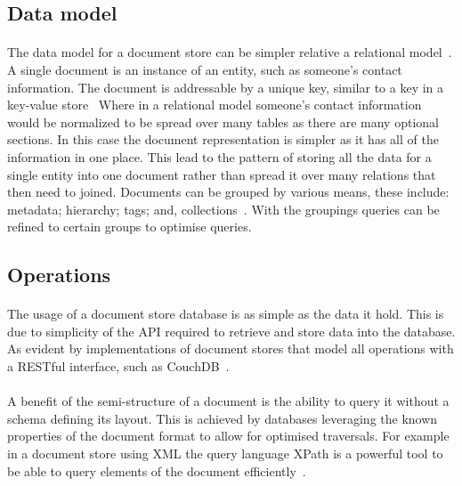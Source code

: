 \documentclass{CRPITStyle}
\renewcommand{\cite}{\citep}
\begin{document}
\subsection{Data model}

\paragraph{}
The data model for a document store can be simpler relative a relational
model~\cite{nosql_survey}.
A single document is an instance of an entity, such as someone's contact information.
The document is addressable by a unique key, similar to a key in a key-value
store~\cite{nosql_survey,sql_nosql}
Where in a relational model someone's contact information would be
normalized to be spread over many tables as there are many optional
sections.
In this case the document representation is simpler as it has all of the
information in one place.
This lead to the pattern of storing all the data for a single entity into
one document rather than spread it over many relations that then need to
joined.
Documents can be grouped by various means,
these include: metadata; hierarchy; tags; and, collections~\cite{sql_nosql}.
With the groupings queries can be refined to certain groups to optimise
queries.

\subsection{Operations}

\paragraph{}
The usage of a document store database is as simple as the data it hold.
This is due to simplicity of the API required to retrieve and store data into
the database.
As evident by implementations of document stores that model all operations
with a RESTful interface, such as CouchDB~\cite{couchdb}.

\paragraph{}
A benefit of the semi-structure of a document is the ability to query it
without a schema defining its layout.
This is achieved by databases leveraging the known properties of the
document format to allow for optimised traversals.
For example in a document store using XML the query language XPath is a
powerful tool to be able to query elements of the document
efficiently~\cite{xpath}.
\end{document}
